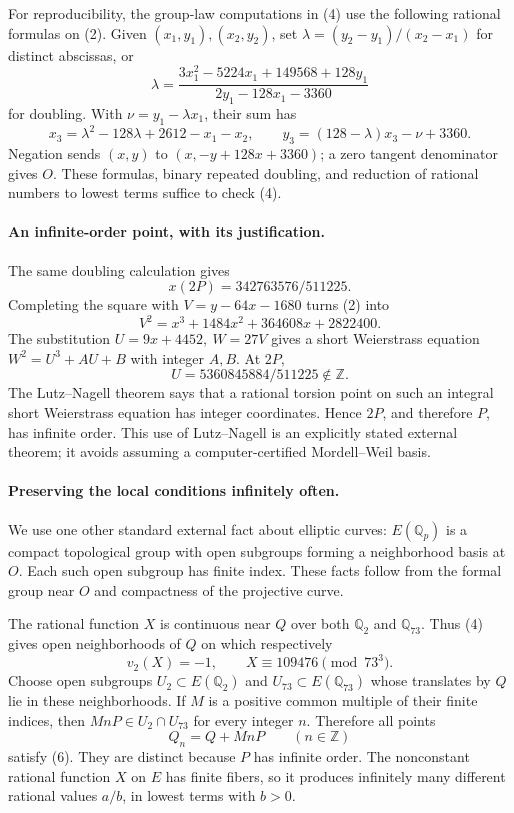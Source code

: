 For reproducibility, the group-law computations in (4) use the following rational formulas on (2). Given \((x_1,y_1),(x_2,y_2)\), set
\(\lambda=(y_2-y_1)/(x_2-x_1)\) for distinct abscissas, or
\[
 \lambda=\frac{3x_1^2-5224x_1+149568+128y_1}
                    {2y_1-128x_1-3360}
\]
for doubling. With \(\nu=y_1-\lambda x_1\), their sum has
\[
 x_3=\lambda^2-128\lambda+2612-x_1-x_2,
 \qquad y_3=(128-\lambda)x_3-\nu+3360.
\]
Negation sends \((x,y)\) to \((x,-y+128x+3360)\); a zero tangent denominator gives \(O\). These formulas, binary repeated doubling, and reduction of rational numbers to lowest terms suffice to check (4).

\paragraph{An infinite-order point, with its justification.}
The same doubling calculation gives
\[
 x(2P)=342763576/511225.
\]
Completing the square with \(V=y-64x-1680\) turns (2) into
\[
 V^2=x^3+1484x^2+364608x+2822400.
\]
The substitution \(U=9x+4452,\ W=27V\) gives a short Weierstrass equation \(W^2=U^3+AU+B\) with integer \(A,B\). At \(2P\),
\[
 U=5360845884/511225\notin\mathbb Z.
\]
The Lutz--Nagell theorem says that a rational torsion point on such an integral short Weierstrass equation has integer coordinates. Hence \(2P\), and therefore \(P\), has infinite order. This use of Lutz--Nagell is an explicitly stated external theorem; it avoids assuming a computer-certified Mordell--Weil basis.

\paragraph{Preserving the local conditions infinitely often.}
We use one other standard external fact about elliptic curves: \(E(\mathbb Q_p)\) is a compact topological group with open subgroups forming a neighborhood basis at \(O\). Each such open subgroup has finite index. These facts follow from the formal group near \(O\) and compactness of the projective curve.

The rational function \(X\) is continuous near \(Q\) over both \(\mathbb Q_2\) and \(\mathbb Q_{73}\). Thus (4) gives open neighborhoods of \(Q\) on which respectively
\[
 v_2(X)=-1,\qquad X\equiv109476\pmod{73^3}. \tag{6}
\]
Choose open subgroups \(U_2\subset E(\mathbb Q_2)\) and \(U_{73}\subset E(\mathbb Q_{73})\) whose translates by \(Q\) lie in these neighborhoods. If \(M\) is a positive common multiple of their finite indices, then \(MnP\in U_2\cap U_{73}\) for every integer \(n\). Therefore all points
\[
 Q_n=Q+MnP\qquad(n\in\mathbb Z)
\]
satisfy (6). They are distinct because \(P\) has infinite order. The nonconstant rational function \(X\) on \(E\) has finite fibers, so it produces infinitely many different rational values \(a/b\), in lowest terms with \(b>0\).

